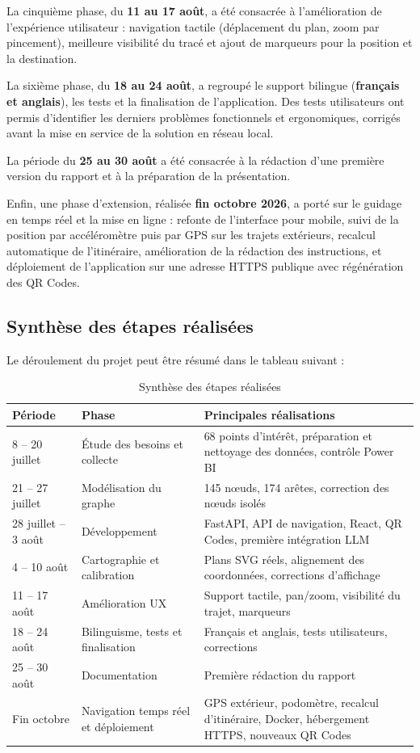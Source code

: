 \documentclass[12pt,a4paper]{report}
\begin{document}
La cinquième phase, du \textbf{11 au 17 août}, a été consacrée à l'amélioration de l'expérience
utilisateur : navigation tactile (déplacement du plan, zoom par pincement), meilleure visibilité
du tracé et ajout de marqueurs pour la position et la destination.

La sixième phase, du \textbf{18 au 24 août}, a regroupé le support bilingue (\textbf{français et
anglais}), les tests et la finalisation de l'application. Des tests utilisateurs ont permis
d'identifier les derniers problèmes fonctionnels et ergonomiques, corrigés avant la mise en
service de la solution en réseau local.

La période du \textbf{25 au 30 août} a été consacrée à la rédaction d'une première version du
rapport et à la préparation de la présentation.

Enfin, une phase d'extension, réalisée \textbf{fin octobre 2026}, a porté sur le guidage en temps
réel et la mise en ligne : refonte de l'interface pour mobile, suivi de la position par
accéléromètre puis par GPS sur les trajets extérieurs, recalcul automatique de l'itinéraire,
amélioration de la rédaction des instructions, et déploiement de l'application sur une adresse
HTTPS publique avec régénération des QR Codes.

\subsection{Synthèse des étapes réalisées}

Le déroulement du projet peut être résumé dans le tableau suivant :

\begin{table}[h]
\centering
\caption{Synthèse des étapes réalisées}
\label{tab:etapes}
\small
\begin{tabularx}{\linewidth}{@{}p{2.6cm}p{3.2cm}X@{}}
\toprule
\textbf{Période} & \textbf{Phase} & \textbf{Principales réalisations}\\
\midrule
8 -- 20 juillet & Étude des besoins et collecte & 68 points d'intérêt, préparation et nettoyage des données, contrôle Power BI\\
21 -- 27 juillet & Modélisation du graphe & 145 nœuds, 174 arêtes, correction des nœuds isolés\\
28 juillet -- 3 août & Développement & FastAPI, API de navigation, React, QR Codes, première intégration LLM\\
4 -- 10 août & Cartographie et calibration & Plans SVG réels, alignement des coordonnées, corrections d'affichage\\
11 -- 17 août & Amélioration UX & Support tactile, pan/zoom, visibilité du trajet, marqueurs\\
18 -- 24 août & Bilinguisme, tests et finalisation & Français et anglais, tests utilisateurs, corrections\\
25 -- 30 août & Documentation & Première rédaction du rapport\\
Fin octobre & Navigation temps réel et déploiement & GPS extérieur, podomètre, recalcul d'itinéraire, Docker, hébergement HTTPS, nouveaux QR Codes\\
\bottomrule
\end{tabularx}
\end{table}
\end{document}
